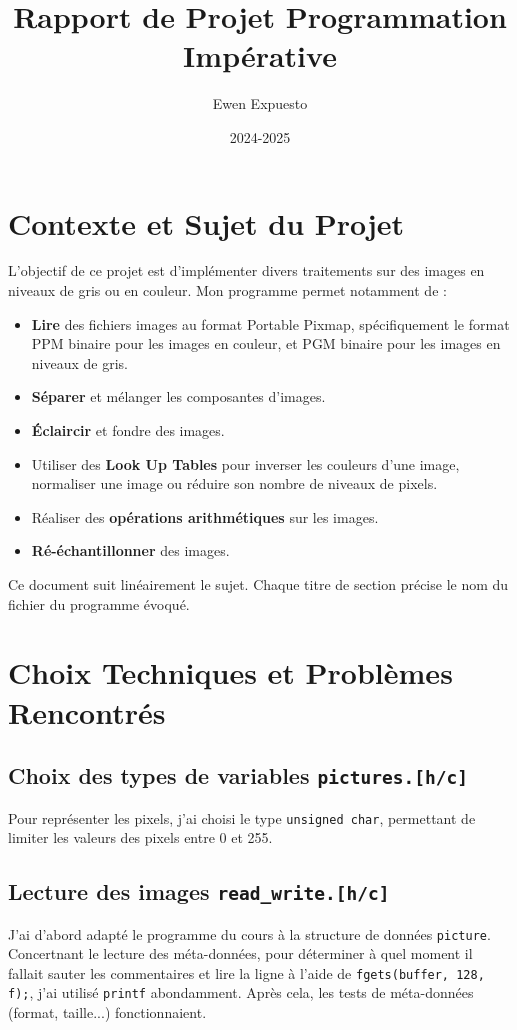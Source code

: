 \documentclass[a4paper,12pt]{article}
\title{Rapport de Projet Programmation Impérative}
\author{Ewen Expuesto}
\date{2024-2025}
\begin{document}
\maketitle
\newpage
\tableofcontents
\newpage

\section{Contexte et Sujet du Projet}
L'objectif de ce projet est d’implémenter divers traitements sur des images en niveaux de gris ou en couleur. Mon programme permet notamment de :
\begin{itemize}
    \item \textbf{Lire} des fichiers images au format Portable Pixmap, spécifiquement le format PPM binaire pour les images en couleur, et PGM binaire pour les images en niveaux de gris.
    \item \textbf{Séparer} et mélanger les composantes d'images.
    \item \textbf{Éclaircir} et fondre des images.
    \item Utiliser des \textbf{Look Up Tables} pour inverser les couleurs d'une image, normaliser une image ou réduire son nombre de niveaux de pixels.
    \item Réaliser des \textbf{opérations arithmétiques} sur les images.
    \item \textbf{Ré-échantillonner} des images.
\end{itemize}
Ce document suit linéairement le sujet. Chaque titre de section précise le nom du fichier du programme évoqué.

\newpage

\section{Choix Techniques et Problèmes Rencontrés}

\subsection{Choix des types de variables \texttt{pictures.[h/c]}}
Pour représenter les pixels, j'ai choisi le type \texttt{unsigned char}, permettant de limiter les valeurs des pixels entre 0 et 255. 

\subsection{Lecture des images \texttt{read\_write.[h/c]}}
J'ai d'abord adapté le programme du cours à la structure de données \texttt{picture}. Concertnant le lecture des méta-données, pour déterminer à quel moment il fallait sauter les commentaires et lire la ligne à l'aide de \texttt{fgets(buffer, 128, f);}, j'ai utilisé \texttt{printf} abondamment. Après cela, les tests de méta-données (format, taille...) fonctionnaient.
\end{document}
